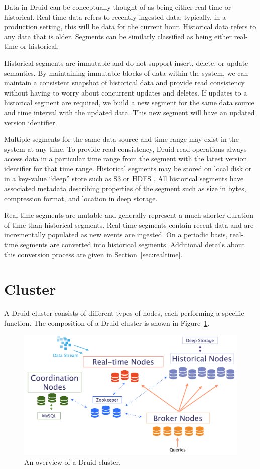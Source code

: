 \documentclass{vldb}
\begin{document}
Data in Druid can be conceptually thought of as being either real-time
or historical. Real-time data refers to recently ingested data;
typically, in a production setting, this will be data for the current
hour. Historical data refers to any data that is older. Segments can
be similarly classified as being either real-time or historical.

Historical segments are immutable and do not support insert, delete,
or update semantics. By maintaining immutable blocks of data within
the system, we can maintain a consistent snapshot of historical
data and provide read consistency without having to worry about
concurrent updates and deletes. If updates to a historical segment are
required, we build a new segment for the same data source and time
interval with the updated data. This new segment will have an updated version identifier.

Multiple segments for the same data source and time range
may exist in the system at any time. To provide read consistency,
Druid read operations always access data in a particular time range
from the segment with the latest version identifier for that time
range. Historical segments may be stored on local disk or in a
key-value “deep” store such as S3 \cite{decandia2007dynamo} or HDFS \cite{shvachko2010hadoop}. All historical
segments have associated metadata describing properties of the segment
such as size in bytes, compression format, and location in deep
storage.

Real-time segments are mutable and generally represent a much shorter
duration of time than historical segments. Real-time segments contain
recent data and are incrementally populated as new events are
ingested. On a periodic basis, real-time segments are converted into
historical segments. Additional details about this conversion process
are given in Section~\ref{sec:realtime}.

\section{Cluster}
\label{sec:cluster}
A Druid cluster consists of different types of nodes, each performing
a specific function. The composition of a Druid cluster is shown in
Figure~\ref{fig:druid_cluster}.

\begin{figure}
\centering
\includegraphics[width = 6in]{druid_cluster}
\caption{An overview of a Druid cluster.}
\label{fig:druid_cluster}
\end{figure}
\end{document}
